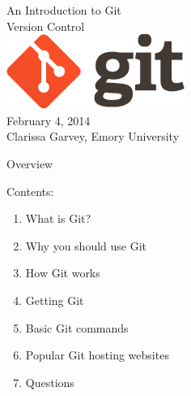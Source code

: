 \documentclass[xcolor=dvipsnames]{beamer}
\begin{document}
\begin{frame}
\begin{center}
\vspace{5mm}
{\huge An Introduction to Git\\ \vspace{1mm} Version Control}\\
\vspace{7mm}
\includegraphics[scale=.3]{gitlogo}\\
\vspace{8mm}
{\large February 4, 2014}\\
Clarissa Garvey, Emory University
\end{center}
\end{frame}

\begin{frame}{Overview}

{\large Contents:}
\begin{enumerate}
\item What is Git?
\item Why you should use Git %
\item How Git works
\item Getting Git
\item Basic Git commands
\item Popular Git hosting websites
\item Questions
\end{enumerate}
\end{frame}
\end{document}

